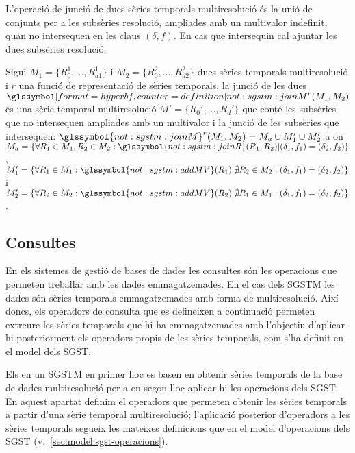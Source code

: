 L'operació de junció de dues sèries temporals multiresolució
és la unió de conjunts per a les subsèries resolució, ampliades amb un
multivalor indefinit, quan no intersequen en les claus $(\delta,f)$. En
cas que intersequin cal ajuntar les dues subsèries resolució.
\begin{definition}
  Sigui $M_1=\{R_0^1,\dotsc,R_{d1}^1\}$ i
  $M_2=\{R_0^2,\dotsc,R_{d2}^2\}$ dues sèries temporals multiresolució
  i $r$ una funció de representació de sèries temporals, la junció de
  les dues $\glssymboldef{not:sgstm:joinM}^r(M_1, M_2)$ és una sèrie
  temporal multiresolució $M'=\{R_0',\dotsc,R_d'\}$ que conté les
  subsèries que no intersequen ampliades amb un multivalor i la junció
  de les subsèries que intersequen:
  $\glssymbol{not:sgstm:joinM}^r(M_1, M_2)= M_{a} \cup M'_{1} \cup
  M'_{2}$ a on $M_a = \{\forall R_1\in M_1,R_2\in M_2:
  \glssymbol{not:sgstm:joinR}(R_1,R_2) | (\delta_1,f_1) =
  (\delta_2,f_2) \}$, $M_1' = \{\forall R_1\in M_1:
  \glssymbol{not:sgstm:addMV}(R_1)| \nexists R_2 \in M_2 :
  (\delta_1,f_1) = (\delta_2,f_2) \}$ i $M_2' = \{\forall R_2\in M_2:
  \glssymbol{not:sgstm:addMV}(R_2)| \nexists R_1 \in M_1 :
  (\delta_1,f_1) = (\delta_2,f_2) \}$.
\end{definition}





\subsection{Consultes}

En els sistemes de gestió de bases de dades les consultes són les
operacions que permeten treballar amb les dades emmagatzemades. En el
cas dels SGSTM les dades són sèries temporals emmagatzemades amb forma
de multiresolució. Així doncs, els operadors de consulta que es
defineixen a continuació permeten extreure les sèries temporals que hi
ha emmagatzemades amb l'objectiu d’aplicar-hi posteriorment els
operadors propis de les sèries temporals, com s'ha definit en el model
dels SGST.

Els  en un SGSTM
en primer lloc es basen en obtenir sèries temporals de la base de
dades multiresolució per a en segon lloc aplicar-hi les operacions
dels SGST.  En aquest apartat definim el operadors que permeten
obtenir les sèries temporals a partir d'una sèrie temporal
multiresolució; l'aplicació posterior d'operadors a les sèries
temporals segueix les mateixes definicions que en el model
d'operacions dels SGST (v.~\autoref{sec:model:sgst-operacions}).

